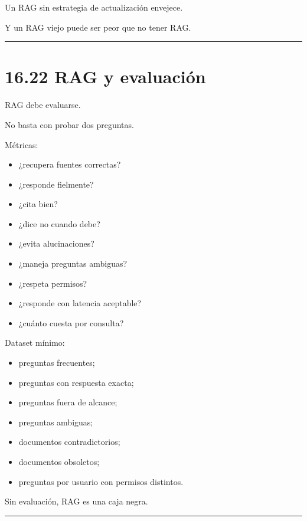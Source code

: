 Un RAG sin estrategia de actualización envejece.

Y un RAG viejo puede ser peor que no tener RAG.

\begin{center}\rule{0.5\linewidth}{0.5pt}\end{center}

\section{16.22 RAG y evaluación}\label{rag-y-evaluaciuxf3n}

RAG debe evaluarse.

No basta con probar dos preguntas.

Métricas:

\begin{itemize}
\tightlist
\item
  ¿recupera fuentes correctas?
\item
  ¿responde fielmente?
\item
  ¿cita bien?
\item
  ¿dice no cuando debe?
\item
  ¿evita alucinaciones?
\item
  ¿maneja preguntas ambiguas?
\item
  ¿respeta permisos?
\item
  ¿responde con latencia aceptable?
\item
  ¿cuánto cuesta por consulta?
\end{itemize}

Dataset mínimo:

\begin{itemize}
\tightlist
\item
  preguntas frecuentes;
\item
  preguntas con respuesta exacta;
\item
  preguntas fuera de alcance;
\item
  preguntas ambiguas;
\item
  documentos contradictorios;
\item
  documentos obsoletos;
\item
  preguntas por usuario con permisos distintos.
\end{itemize}

Sin evaluación, RAG es una caja negra.

\begin{center}\rule{0.5\linewidth}{0.5pt}\end{center}


